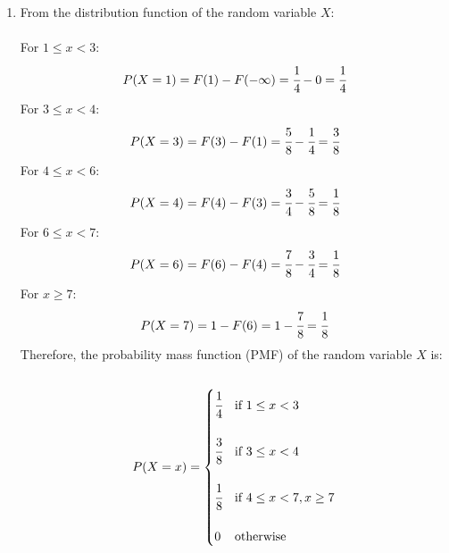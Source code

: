 \documentclass{article}
\begin{document}
\begin{enumerate}
\newpage
\item 
  From the distribution function of the random variable \(X\):\\\\
  For $1 \leq x < 3$:
  \begin{align*}
    P(X = 1) = F(1) - F(-\infty) = \cfrac{1}{4} - 0 = \cfrac{1}{4}
  \end{align*}
  For $3 \leq x < 4$:
  \begin{align*}
    P(X = 3) = F(3) - F(1) = \cfrac{5}{8} - \cfrac{1}{4} = \cfrac{3}{8}
  \end{align*}
  For $4 \leq x < 6$:
  \begin{align*}
    P(X = 4) = F(4) - F(3) = \cfrac{3}{4} - \cfrac{5}{8} = \cfrac{1}{8}
  \end{align*}
  For $6 \leq x < 7$:
  \begin{align*}
    P(X = 6) = F(6) - F(4) = \cfrac{7}{8} - \cfrac{3}{4} = \cfrac{1}{8}
  \end{align*}
  For $x \geq 7$:
  \begin{align*}
    P(X = 7) = 1 - F(6) = 1 - \cfrac{7}{8} = \cfrac{1}{8}
  \end{align*}
  Therefore, the probability mass function (PMF) of the random variable $X$ is:\\\\
  \[ P(X = x) = 
    \begin{cases} 
    \cfrac{1}{4} & \text{if } 1 \leq x < 3 \\\\
    \cfrac{3}{8} & \text{if } 3 \leq x < 4 \\\\
    \cfrac{1}{8} & \text{if } 4 \leq x < 7, x \geq 7 \\\\
    0 & \text{otherwise}
    \end{cases}
  \]


\end{enumerate}
\end{document}
